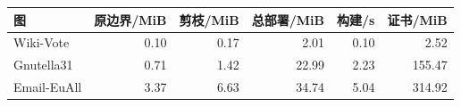 {\fontsize{9}{11}\selectfont\centering\begin{tabular*}{\textwidth}{@{\extracolsep{\fill}}lrrrrr@{}}\toprule
图 & 原边界/MiB & 剪枝/MiB & 总部署/MiB & 构建/s & 证书/MiB\\\midrule
Wiki-Vote & 0.10 & 0.17 & 2.01 & 0.10 & 2.52\\
Gnutella31 & 0.71 & 1.42 & 22.99 & 2.23 & 155.47\\
Email-EuAll & 3.37 & 6.63 & 34.74 & 5.04 & 314.92\\
\bottomrule\end{tabular*}\par}